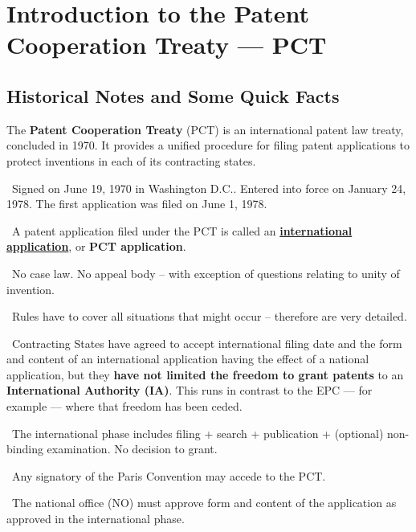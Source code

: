 \documentclass{report}
\newcommand{\n}{\newline}
\newcommand{\p}{\adforn{61} \ }
\begin{document}
	
	\thispagestyle{empty}
	\newpage%
	\tableofcontents

\chapter{Introduction to the Patent Cooperation Treaty --- PCT}
\section{Historical Notes and Some Quick Facts}

The \textbf{Patent Cooperation Treaty} (PCT) is an international patent law treaty, concluded in 1970. It provides a unified procedure for filing patent applications to protect inventions in each of its contracting states. \newline

\p   Signed on June 19, 1970 in Washington D.C.. Entered into force on January 24, 1978. The first application was filed on June 1, 1978.\newline

\p A patent application filed under the PCT is called an \underline{\textbf{international application}}, or \textbf{PCT application}. \n

\p No case law. No appeal body -- with exception of questions relating to unity of invention. \n

\p Rules have to cover all situations that might occur -- therefore are very detailed. \n

\p Contracting States have agreed to accept international filing date and the form and content of an international application having the effect of a national application, but they \textbf{have not limited the freedom to grant patents} to an \textbf{International Authority (IA)}. This runs in contrast to the EPC --- for example --- where that freedom has been ceded. \n

\p The international phase includes filing + search + publication + (optional) non-binding examination. No decision to grant. \n

\vspace{5mm}
\p Any signatory of the Paris Convention may accede to the PCT. \n

\p The national office (NO) must approve form and content of the application as approved in the international phase. \n
\end{document}
